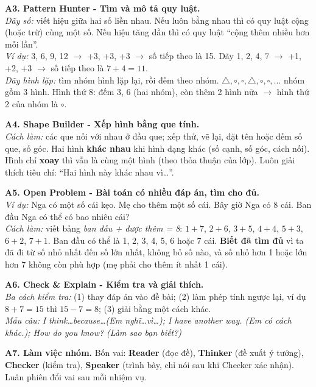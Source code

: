 \documentclass[11pt,a4paper]{article}
\begin{document}
\textbf{A3. Pattern Hunter - Tìm và mô tả quy luật.}\\
\textit{Dãy số:} viết hiệu giữa hai số liền nhau. Nếu luôn bằng nhau thì có quy luật cộng (hoặc trừ) cùng một số. Nếu hiệu tăng dần thì có quy luật ``cộng thêm nhiều hơn mỗi lần''.\\
\textit{Ví dụ:} 3, 6, 9, 12 $\rightarrow$ +3, +3, +3 $\rightarrow$ số tiếp theo là 15. Dãy 1, 2, 4, 7 $\rightarrow$ +1, +2, +3 $\rightarrow$ số tiếp theo là $7+4=11$.\\
\textit{Dãy hình lặp:} tìm nhóm hình lặp lại, rồi đếm theo nhóm. $\triangle,\circ,\square,\triangle,\circ,\square,\ldots$ nhóm gồm 3 hình. Hình thứ 8: đếm 3, 6 (hai nhóm), còn thêm 2 hình nữa $\rightarrow$ hình thứ 2 của nhóm là $\circ$.

\textbf{A4. Shape Builder - Xếp hình bằng que tính.}\\
\textit{Cách làm:} các que nối với nhau ở đầu que; xếp thử, vẽ lại, đặt tên hoặc đếm số que, số góc. Hai hình \textbf{khác nhau} khi hình dạng khác (số cạnh, số góc, cách nối). Hình chỉ \textbf{xoay} thì vẫn là cùng một hình (theo thỏa thuận của lớp). Luôn giải thích tiêu chí: ``Hai hình này khác nhau vì\ldots''.

\textbf{A5. Open Problem - Bài toán có nhiều đáp án, tìm cho đủ.}\\
\textit{Ví dụ:} Nga có một số cái kẹo. Mẹ cho thêm một số cái. Bây giờ Nga có 8 cái. Ban đầu Nga có thể có bao nhiêu cái?\\
\textit{Cách làm:} viết bảng \textit{ban đầu + được thêm = 8}: $1+7$, $2+6$, $3+5$, $4+4$, $5+3$, $6+2$, $7+1$. Ban đầu có thể là 1, 2, 3, 4, 5, 6 hoặc 7 cái. \textbf{Biết đã tìm đủ} vì ta đã đi từ số nhỏ nhất đến số lớn nhất, không bỏ số nào, và số nhỏ hơn 1 hoặc lớn hơn 7 không còn phù hợp (mẹ phải cho thêm ít nhất 1 cái).

\textbf{A6. Check \& Explain - Kiểm tra và giải thích.}\\
\textit{Ba cách kiểm tra:} (1) thay đáp án vào đề bài; (2) làm phép tính ngược lại, ví dụ $8+7=15$ thì $15-7=8$; (3) giải bằng một cách khác.\\
\textit{Mẫu câu:} \textit{I think\ldots because\ldots (Em nghĩ\ldots vì\ldots); I have another way. (Em có cách khác.); How do you know? (Làm sao bạn biết?)}

\textbf{A7. Làm việc nhóm.} Bốn vai: \textbf{Reader} (đọc đề), \textbf{Thinker} (đề xuất ý tưởng), \textbf{Checker} (kiểm tra), \textbf{Speaker} (trình bày, chỉ nói sau khi Checker xác nhận). Luân phiên đổi vai sau mỗi nhiệm vụ.
\end{document}
